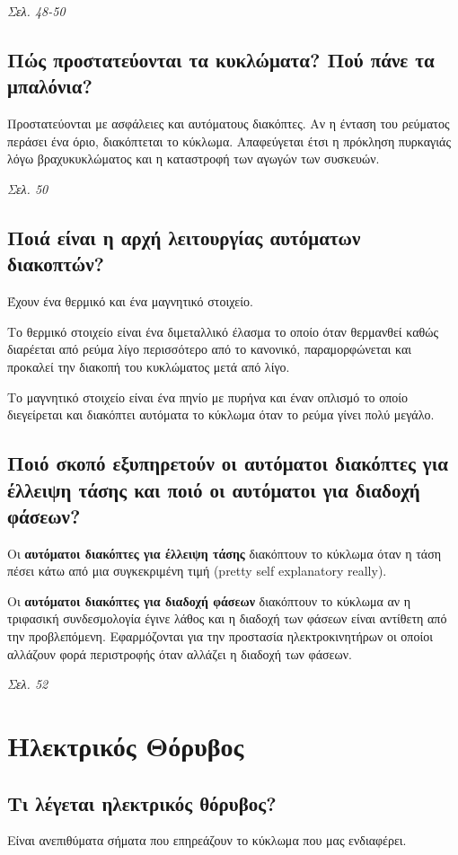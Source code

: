 \documentclass{article}
\begin{document}
\emph{Σελ. 48-50}

\subsection{Πώς προστατεύονται τα κυκλώματα? Πού πάνε τα μπαλόνια?}
Προστατεύονται με ασφάλειες και αυτόματους διακόπτες. Αν η ένταση του ρεύματος περάσει ένα όριο, διακόπτεται το κύκλωμα. Απαφεύγεται έτσι η πρόκληση πυρκαγιάς λόγω 
βραχυκυκλώματος και η καταστροφή των αγωγών των συσκευών.

\emph{Σελ. 50}
\subsection{Ποιά είναι η αρχή λειτουργίας αυτόματων διακοπτών?}
Έχουν ένα θερμικό και ένα μαγνητικό στοιχείο. 

Το θερμικό στοιχείο είναι ένα διμεταλλικό έλασμα το οποίο όταν θερμανθεί καθώς διαρέεται από ρεύμα λίγο περισσότερο από το κανονικό, παραμορφώνεται και προκαλεί
την διακοπή του κυκλώματος μετά από λίγο. 

Το μαγνητικό στοιχείο είναι ένα πηνίο με πυρήνα και έναν οπλισμό το οποίο διεγείρεται και διακόπτει αυτόματα το κύκλωμα όταν το ρεύμα γίνει πολύ μεγάλο.

\subsection{Ποιό σκοπό εξυπηρετούν οι αυτόματοι διακόπτες για έλλειψη τάσης και ποιό οι αυτόματοι για διαδοχή φάσεων?}

Οι \textbf{αυτόματοι διακόπτες για έλλειψη τάσης} διακόπτουν το κύκλωμα όταν η τάση πέσει κάτω από μια συγκεκριμένη τιμή 
(\foreignlanguage{english}{pretty self explanatory really}). 

Οι \textbf{αυτόματοι διακόπτες για διαδοχή φάσεων} διακόπτουν το κύκλωμα αν η τριφασική συνδεσμολογία έγινε λάθος και η διαδοχή των φάσεων είναι αντίθετη από την 
προβλεπόμενη. Εφαρμόζονται για την προστασία ηλεκτροκινητήρων οι οποίοι αλλάζουν φορά περιστροφής όταν αλλάζει η διαδοχή των φάσεων.

\emph{Σελ. 52}

\section{Ηλεκτρικός Θόρυβος}
\subsection{Τι λέγεται ηλεκτρικός θόρυβος?}
Είναι ανεπιθύματα σήματα που επηρεάζουν το κύκλωμα που μας ενδιαφέρει.
\end{document}
